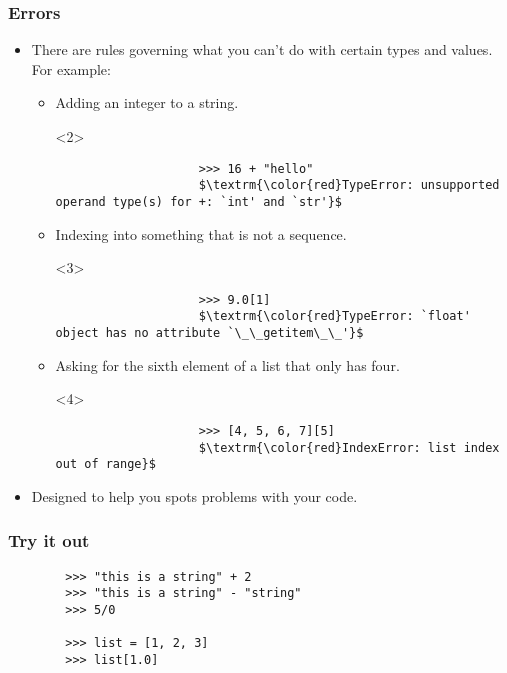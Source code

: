 \documentclass[notes]{beamer}
\begin{document}
	\begin{frame}[fragile]
		\frametitle{Errors}
		
		\begin{itemize}
			\item There are rules governing what you can't do with certain types and values.
			\pause For example:
			\begin{itemize}
				\item Adding an integer to a string.
				\begin{onlyenv}<2>
					\begin{lstlisting}
					>>> 16 + "hello"
					$\textrm{\color{red}TypeError: unsupported operand type(s) for +: `int' and `str'}$
					\end{lstlisting}
				\end{onlyenv}
				
				\pause
				
				\item Indexing into something that is not a sequence.
				\begin{onlyenv}<3>
					\begin{lstlisting}
					>>> 9.0[1]
					$\textrm{\color{red}TypeError: `float' object has no attribute `\_\_getitem\_\_'}$
					\end{lstlisting}
				\end{onlyenv}
				
				\pause
				
				\item Asking for the sixth element of a list that only has four.
				\begin{onlyenv}<4>
					\begin{lstlisting}
					>>> [4, 5, 6, 7][5]
					$\textrm{\color{red}IndexError: list index out of range}$
					\end{lstlisting}
				\end{onlyenv}
				
				\pause
			\end{itemize}
			\item Designed to help you spots problems with your code.
		\end{itemize}
	\end{frame}
	
	\begin{frame}[fragile]
		\frametitle{Try it out}
		
		\begin{lstlisting}
		>>> "this is a string" + 2
		>>> "this is a string" - "string"
		>>> 5/0
		
		>>> list = [1, 2, 3]
		>>> list[1.0]
		\end{lstlisting}
	\end{frame}
	
\end{document}
